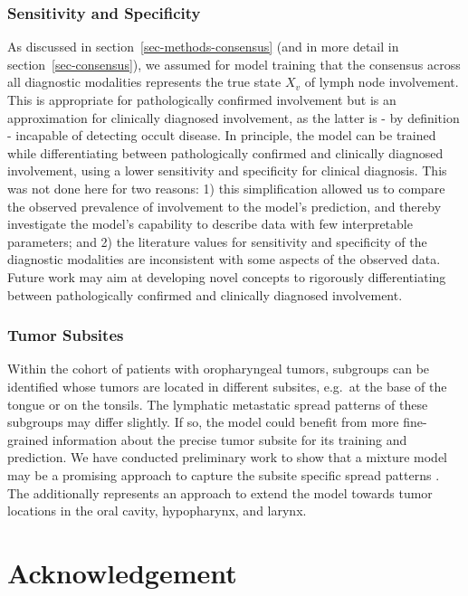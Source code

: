\documentclass[
  sn-mathphys-num,
]{sn-jnl}
\begin{document}
\subsubsection{Sensitivity and
Specificity}\label{sensitivity-and-specificity}

As discussed in section~\ref{sec-methods-consensus} (and in more detail
in section~\ref{sec-consensus}), we assumed for model training that the
consensus across all diagnostic modalities represents the true state
\(X_v\) of lymph node involvement. This is appropriate for
pathologically confirmed involvement but is an approximation for
clinically diagnosed involvement, as the latter is - by definition -
incapable of detecting occult disease. In principle, the model can be
trained while differentiating between pathologically confirmed and
clinically diagnosed involvement, using a lower sensitivity and
specificity for clinical diagnosis. This was not done here for two
reasons: 1) this simplification allowed us to compare the observed
prevalence of involvement to the model's prediction, and thereby
investigate the model's capability to describe data with few
interpretable parameters; and 2) the literature values for sensitivity
and specificity of the diagnostic modalities are inconsistent with some
aspects of the observed data. Future work may aim at developing novel
concepts to rigorously differentiating between pathologically confirmed
and clinically diagnosed involvement.

\subsubsection{Tumor Subsites}\label{tumor-subsites}

Within the cohort of patients with oropharyngeal tumors, subgroups can
be identified whose tumors are located in different subsites, e.g.~at
the base of the tongue or on the tonsils. The lymphatic metastatic
spread patterns of these subgroups may differ slightly. If so, the model
could benefit from more fine-grained information about the precise tumor
subsite for its training and prediction. We have conducted preliminary
work to show that a mixture model may be a promising approach to capture
the subsite specific spread patterns \citep[cite ICCR
paper,][]{zora231470}. The additionally represents an approach to extend
the model towards tumor locations in the oral cavity, hypopharynx, and
larynx.

\section{Acknowledgement}\label{acknowledgement}
\end{document}
